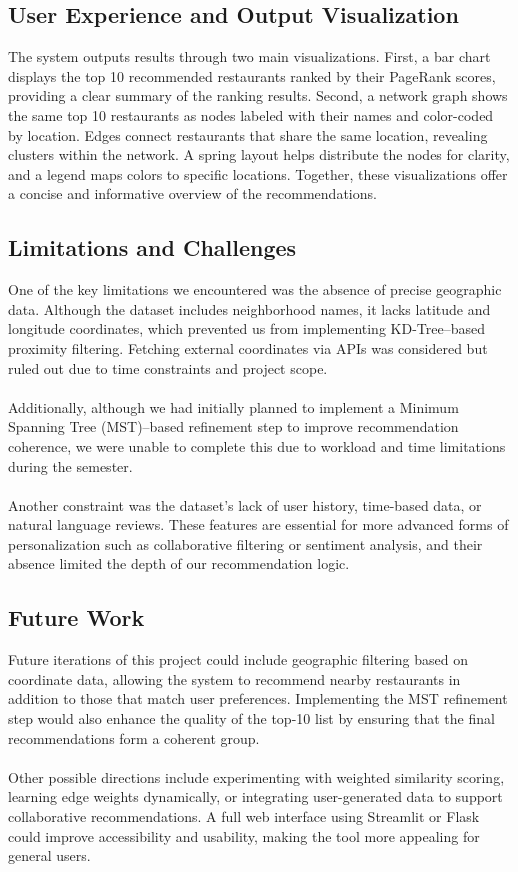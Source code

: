 \documentclass[fontsize=11pt]{article}
\begin{document}
\subsection*{User Experience and Output Visualization}

The system outputs results through two main visualizations. First, a bar chart displays the top 10 recommended restaurants ranked by their PageRank scores, providing a clear summary of the ranking results. Second, a network graph shows the same top 10 restaurants as nodes labeled with their names and color-coded by location. Edges connect restaurants that share the same location, revealing clusters within the network. A spring layout helps distribute the nodes for clarity, and a legend maps colors to specific locations. Together, these visualizations offer a concise and informative overview of the recommendations.

\subsection*{Limitations and Challenges}

One of the key limitations we encountered was the absence of precise geographic data. Although the dataset includes neighborhood names, it lacks latitude and longitude coordinates, which prevented us from implementing KD-Tree–based proximity filtering. Fetching external coordinates via APIs was considered but ruled out due to time constraints and project scope.\\ \\
Additionally, although we had initially planned to implement a Minimum Spanning Tree (MST)–based refinement step to improve recommendation coherence, we were unable to complete this due to workload and time limitations during the semester.\\ \\
Another constraint was the dataset’s lack of user history, time-based data, or natural language reviews. These features are essential for more advanced forms of personalization such as collaborative filtering or sentiment analysis, and their absence limited the depth of our recommendation logic.

\subsection*{Future Work}

Future iterations of this project could include geographic filtering based on coordinate data, allowing the system to recommend nearby restaurants in addition to those that match user preferences. Implementing the MST refinement step would also enhance the quality of the top-10 list by ensuring that the final recommendations form a coherent group. \\ \\
Other possible directions include experimenting with weighted similarity scoring, learning edge weights dynamically, or integrating user-generated data to support collaborative recommendations. A full web interface using Streamlit or Flask could improve accessibility and usability, making the tool more appealing for general users.
\end{document}
